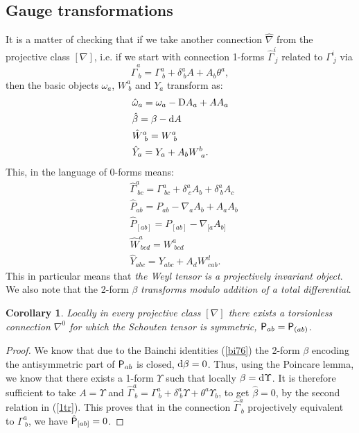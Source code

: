 \documentclass[letterpaper]{amsart}
\newtheorem{corollary}[theorem]{Corollary}
\theoremstyle{definition}
\theoremstyle{remark}
\newcommand{\be}{\begin{equation}}
\newcommand{\ee}{\end{equation}}
\newcommand{\D}{{\rm D}}
\newcommand{\der}{{\rm d}}
\newcommand{\Rho}{{\mbox{\sf P}}}
\begin{document}
\subsection{Gauge transformations} It is a matter of checking that if
we take another connection $\hat{\nabla}$ from the projective class
$[\nabla]$, i.e. if we start with connection 1-forms
$\hat{\Gamma}^i_{~j}$ related to $\Gamma^i_{~j}$ via 
$$\hat{\Gamma}^a_{~b}=\Gamma^a_{~b}+\delta^a_{~b}A+A_b\theta^a,$$
then the basic objects $\omega_a$, $W^a_{~b}$ and $Y_a$ transform as:
\be\begin{aligned}
&\hat{\omega}_a=\omega_a-\D A_a+A A_a\\
&\hat\beta=\beta-\der A\\
&\hat{W}^a_{~b}=W^a_{~b}\\
&\hat{Y}_a=Y_a+A_bW^b_{~a}.
\end{aligned}\label{1tr}
\ee
This, in the language of 0-forms means:
\be\begin{aligned}
&\hat{\Gamma}^a_{~bc}=\Gamma^a_{~bc}+\delta^a_{~c}A_b+\delta^a_{~b}A_c\\
&\hat{P}_{ab}=P_{ab}-\nabla_aA_b+A_aA_b\\
&\hat{P}_{[ab]}=P_{[ab]}-\nabla_{[a}A_{b]}\\
&\hat{W}^a_{~bcd}=W^a_{~bcd}\\
&\hat{Y}_{abc}=Y_{abc}+A_dW^d_{~cab}.
\end{aligned}\label{2tr}
\ee
This in particular means that \emph{the Weyl tensor is a projectively
  invariant object}. We also note that the 2-form $\beta$ \emph{transforms
modulo addition of a total differential}.
\begin{corollary}
Locally in every projective class $[\nabla]$ there exists a
torsionless connection $\nabla^0$ for which the Schouten tensor is
symmetric, $\Rho_{ab}=\Rho_{(ab)}$. 
\end{corollary}
\begin{proof}
We know that due to the Bainchi identities (\ref{bi76}) the 2-form
$\beta$ encoding the antisymmetric part of $\Rho_{ab}$ is closed,
$\der\beta=0$. Thus, using the Poincare lemma, we know that 
there exists a 1-form $\Upsilon$ such that locally
$\beta=\der\Upsilon$. It is therefore sufficient to take $A=\Upsilon$
and
$\hat{\Gamma}^a_{~b}=\Gamma^a_{~b}+\delta^a_{~b}\Upsilon+\theta^a\Upsilon_b$,
to get $\hat{\beta}=0$, by the second relation in (\ref{1tr}). This
proves that in the connection $\hat{\Gamma}^a_{~b}$ projectively
equivalent to $\Gamma^a_{~b}$, we have $\hat{\Rho}_{[ab]}=0$. 
\end{proof}
\end{document}
